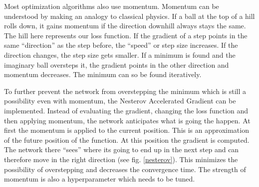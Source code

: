 Most optimization algorithms also use momentum. Momentum can be understood by making an analogy to classical physics. If a ball at the top of a hill rolls down, it gains momentum if the direction downhill always stays the same. The hill here represents our loss function. If the gradient of a step points in the same \enquote{direction} as the step before, the \enquote{speed} or step size increases. If the direction changes, the step size gets smaller. If a minimum is found and the imaginary ball oversteps it, the gradient points in the other direction and momentum decreases. The minimum can so be found iteratively.

To further prevent the network from overstepping the minimum which is still a possibility even with momentum, the Nesterov Accelerated Gradient can be implemented. Instead of evaluating the gradient, changing the loss function and then applying momentum, the network anticipates what is going the happen. At first the momentum is applied to the current position. This is an approximation of the future position of the function. At this position the gradient is computed. The network there \enquote{sees} where its going to end up in the next step and can therefore move in the right direction (see fig. \ref{nesterov}). This minimizes the possibility of overstepping and decreases the convergence time. The strength of momentum is also a hyperparameter which needs to be tuned.

